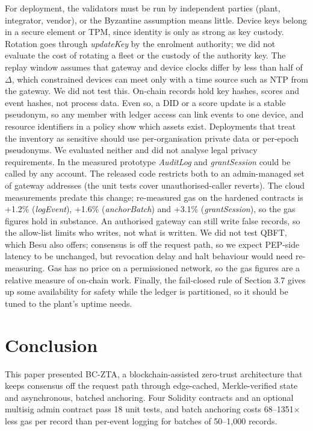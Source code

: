 \documentclass[a4paper,5p,times,twocolumn,number,sort&compress]{elsarticle}
\begin{document}
For deployment, the validators must be run by independent parties (plant, integrator, vendor), or the Byzantine assumption means little. Device keys belong in a secure element or TPM, since identity is only as strong as key custody. Rotation goes through \emph{updateKey} by the enrolment authority; we did not evaluate the cost of rotating a fleet or the custody of the authority key. The replay window assumes that gateway and device clocks differ by less than half of $\Delta$, which constrained devices can meet only with a time source such as NTP from the gateway. We did not test this. On-chain records hold key hashes, scores and event hashes, not process data. Even so, a DID or a score update is a stable pseudonym, so any member with ledger access can link events to one device, and resource identifiers in a policy show which assets exist. Deployments that treat the inventory as sensitive should use per-organisation private data or per-epoch pseudonyms. We evaluated neither and did not analyse legal privacy requirements. In the measured prototype \emph{AuditLog} and \emph{grantSession} could be called by any account. The released code restricts both to an admin-managed set of gateway addresses (the unit tests cover unauthorised-caller reverts). The cloud measurements predate this change; re-measured gas on the hardened contracts is +1.2\% (\emph{logEvent}), +1.6\% (\emph{anchorBatch}) and +3.1\% (\emph{grantSession}), so the gas figures hold in substance. An authorised gateway can still write false records, so the allow-list limits who writes, not what is written. We did not test QBFT, which Besu also offers; consensus is off the request path, so we expect PEP-side latency to be unchanged, but revocation delay and halt behaviour would need re-measuring. Gas has no price on a permissioned network, so the gas figures are a relative measure of on-chain work. Finally, the fail-closed rule of Section 3.7 gives up some availability for safety while the ledger is partitioned, so it should be tuned to the plant's uptime needs.

\section{Conclusion}

This paper presented BC-ZTA, a blockchain-assisted zero-trust architecture that keeps consensus off the request path through edge-cached, Merkle-verified state and asynchronous, batched anchoring. Four Solidity contracts and an optional multisig admin contract pass 18 unit tests, and batch anchoring costs 68--1351$\times$ less gas per record than per-event logging for batches of 50--1,000 records.
\end{document}
